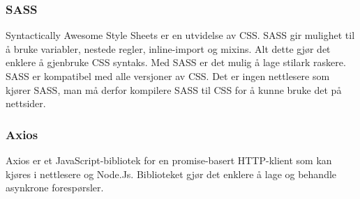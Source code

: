 

\subsubsection{SASS}
Syntactically Awesome Style Sheets \cite{Catlin2006cws} er en utvidelse av CSS. SASS gir mulighet til å bruke variabler, nestede regler, inline-import og mixins. Alt dette gjør det enklere å gjenbruke CSS syntaks. Med SASS er det mulig å lage stilark raskere. SASS er kompatibel med alle versjoner av CSS. Det er ingen nettlesere som kjører SASS, man må derfor kompilere SASS til CSS for å kunne bruke det på nettsider.


\subsubsection{Axios}
\label{sec:tool:axios}
Axios\cite{axios2019a} er et JavaScript-bibliotek for en promise-basert HTTP-klient som kan kjøres i nettlesere og Node.Js. Biblioteket gjør det enklere å lage og behandle asynkrone forespørsler.


